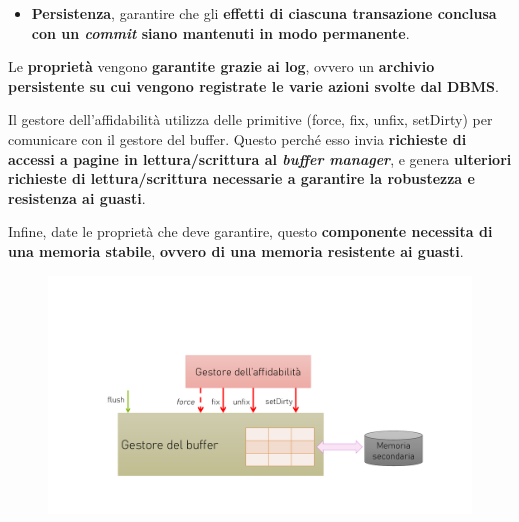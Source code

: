 \documentclass[a4paper]{article}
\begin{document}
\begin{enumerate}
\begin{itemize}
			\item \textbf{Persistenza}, garantire che gli \textbf{effetti di ciascuna transazione conclusa con un \emph{commit} siano mantenuti in modo permanente}.
		\end{itemize}
		Le \textbf{proprietà} vengono \textbf{garantite grazie ai log}, ovvero un \textbf{archivio persistente su cui vengono registrate le varie azioni svolte dal DBMS}.
		
		Il gestore dell'affidabilità utilizza delle primitive (\textsf{force, fix, unfix, setDirty}) per comunicare con il gestore del buffer. Questo perché esso invia \textbf{richieste di accessi a pagine in lettura/scrittura al \emph{buffer manager}}, e genera \textbf{ulteriori richieste di lettura/scrittura necessarie a garantire la robustezza e resistenza ai guasti}.
		
		Infine, date le proprietà che deve garantire, questo \textbf{componente necessita di una memoria stabile}, \textbf{ovvero di una memoria resistente ai guasti}.
		
		\begin{figure}[!htp]
			\centering
			\includegraphics[width=\textwidth]{img/ex/gestore-dei-guasti-1.pdf}
		\end{figure}\newpage
		

\end{enumerate}
\end{document}
